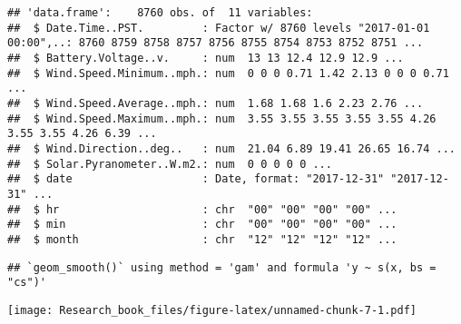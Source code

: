 \documentclass[]{book}
\newenvironment{Shaded}{\begin{snugshade}}{\end{snugshade}}
\newcommand{\KeywordTok}[1]{\textcolor[rgb]{0.13,0.29,0.53}{\textbf{#1}}}
\newcommand{\DataTypeTok}[1]{\textcolor[rgb]{0.13,0.29,0.53}{#1}}
\newcommand{\DecValTok}[1]{\textcolor[rgb]{0.00,0.00,0.81}{#1}}
\newcommand{\StringTok}[1]{\textcolor[rgb]{0.31,0.60,0.02}{#1}}
\newcommand{\OtherTok}[1]{\textcolor[rgb]{0.56,0.35,0.01}{#1}}
\newcommand{\OperatorTok}[1]{\textcolor[rgb]{0.81,0.36,0.00}{\textbf{#1}}}
\newcommand{\NormalTok}[1]{#1}
\theoremstyle{definition}
\theoremstyle{definition}
\theoremstyle{definition}
\theoremstyle{remark}
\begin{document}
\begin{Shaded}
\begin{Highlighting}[]
{{{{{{{{{{{{\KeywordTok{str}\NormalTok{(Paradise_}\DecValTok{2017}\NormalTok{)}
\end{Highlighting}
\end{Shaded}

\begin{verbatim}
## 'data.frame':    8760 obs. of  11 variables:
##  $ Date.Time..PST.         : Factor w/ 8760 levels "2017-01-01 00:00",..: 8760 8759 8758 8757 8756 8755 8754 8753 8752 8751 ...
##  $ Battery.Voltage..v.     : num  13 13 12.4 12.9 12.9 ...
##  $ Wind.Speed.Minimum..mph.: num  0 0 0 0.71 1.42 2.13 0 0 0 0.71 ...
##  $ Wind.Speed.Average..mph.: num  1.68 1.68 1.6 2.23 2.76 ...
##  $ Wind.Speed.Maximum..mph.: num  3.55 3.55 3.55 3.55 3.55 4.26 3.55 3.55 4.26 6.39 ...
##  $ Wind.Direction..deg..   : num  21.04 6.89 19.41 26.65 16.74 ...
##  $ Solar.Pyranometer..W.m2.: num  0 0 0 0 0 ...
##  $ date                    : Date, format: "2017-12-31" "2017-12-31" ...
##  $ hr                      : chr  "00" "00" "00" "00" ...
##  $ min                     : chr  "00" "00" "00" "00" ...
##  $ month                   : chr  "12" "12" "12" "12" ...
\end{verbatim}

\begin{Shaded}
\end{Shaded}

\begin{verbatim}
## `geom_smooth()` using method = 'gam' and formula 'y ~ s(x, bs = "cs")'
\end{verbatim}

\texttt{[image: Research\_book\_files/figure-latex/unnamed-chunk-7-1.pdf]}
\end{document}
